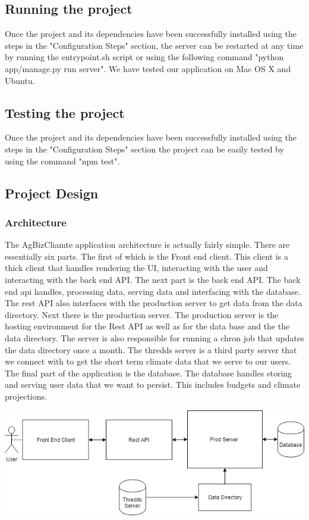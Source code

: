 \documentclass[onecolumn, draftclsnofoot,10pt, compsoc]{article}
\begin{document}
    \subsection{Running the project}
        Once the project and its dependencies have been successfully installed using the steps in the "Configuration Steps" section, the server can be restarted at any time by running the entrypoint.sh script or using the following command "python app/manage.py run server". We have tested our application on Mac OS X and Ubuntu.
    
    \subsection{Testing the project}
        Once the project and its dependencies have been successfully installed using the steps in the "Configuration Steps" section the project can be easily tested by using the command "npm test".
    
    \subsection{Project Design}
        \subsubsection{Architecture}
        The AgBizCliamte application architecture is actually fairly simple. There are essentially six parts. The first of which is the Front end client. This client is a thick client that handles rendering the UI, interacting with the user and interacting with the back end API. The next part is the back end API. The back end api handles, processing data, serving data and interfacing with the database. The rest API also interfaces with the production server to get data from the data directory. Next there is the production server. The production server is the hosting environment for the Rest API as well as for the data base and the the data directory. The server is also responsible for running a chron job that updates the data directory once a month. The thredds server is a third party server that we connect with to get the short term climate data that we serve to our users. The final part of the application is the database. The database handles storing and serving user data that we want to persist. This includes budgets and climate projections. 
        
        \begin{center}
        \includegraphics[width=15cm]{./Images/Architecture.png}
        \end{center}
        
\end{document}
